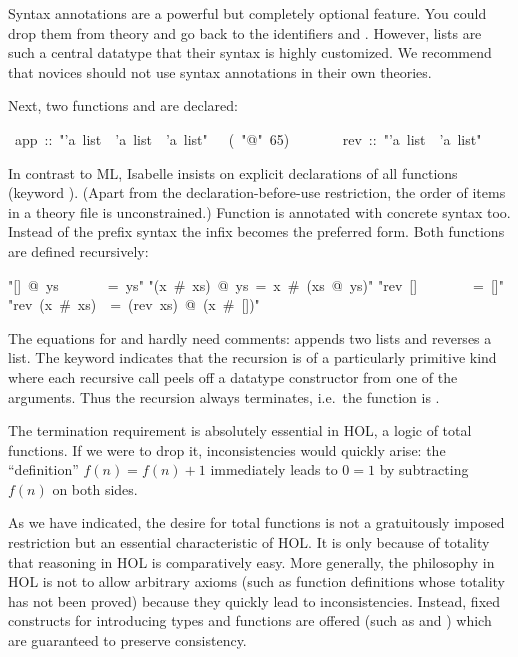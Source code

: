 \begin{isabelle}
\begin{isamarkuptext}
\begin{warn}
  Syntax annotations are a powerful but completely optional feature. You
  could drop them from theory  and go back to the identifiers
   and . However, lists are such a central datatype
  that their syntax is highly customized. We recommend that novices should
  not use syntax annotations in their own theories.
\end{warn}
Next, two functions  and  are declared:%
\end{isamarkuptext}%
\ app\ ::\ {"}'a\ list\ {\isasymRightarrow}\ 'a\ list\ {\isasymRightarrow}\ 'a\ list{"}\ \ \ (\ {"}@{"}\ 65)\isanewline
\ \ \ \ \ \ \ rev\ ::\ {"}'a\ list\ {\isasymRightarrow}\ 'a\ list{"}%
\begin{isamarkuptext}%
\noindent
In contrast to ML, Isabelle insists on explicit declarations of all functions
(keyword ).  (Apart from the declaration-before-use
restriction, the order of items in a theory file is unconstrained.) Function
 is annotated with concrete syntax too. Instead of the prefix
syntax  the infix
 becomes the preferred
form. Both functions are defined recursively:%
\end{isamarkuptext}%
\isanewline
{"}[]\ @\ ys\ \ \ \ \ \ \ =\ ys{"}\isanewline
{"}(x\ \#\ xs)\ @\ ys\ =\ x\ \#\ (xs\ @\ ys){"}\isanewline
\isanewline
{}\isanewline
{"}rev\ []\ \ \ \ \ \ \ \ =\ []{"}\isanewline
{"}rev\ (x\ \#\ xs)\ \ =\ (rev\ xs)\ @\ (x\ \#\ []){"}%
\begin{isamarkuptext}%
\noindent
The equations for  and  hardly need comments:
 appends two lists and  reverses a list.  The keyword
 indicates that the recursion is of a
particularly primitive kind where each recursive call peels off a datatype
constructor from one of the arguments.  Thus the
recursion always terminates, i.e.\ the function is .

The termination requirement is absolutely essential in HOL, a logic of total
functions. If we were to drop it, inconsistencies would quickly arise: the
``definition'' $f(n) = f(n)+1$ immediately leads to $0 = 1$ by subtracting
$f(n)$ on both sides.

\begin{warn}
  As we have indicated, the desire for total functions is not a gratuitously
  imposed restriction but an essential characteristic of HOL. It is only
  because of totality that reasoning in HOL is comparatively easy.  More
  generally, the philosophy in HOL is not to allow arbitrary axioms (such as
  function definitions whose totality has not been proved) because they
  quickly lead to inconsistencies. Instead, fixed constructs for introducing
  types and functions are offered (such as  and
  ) which are guaranteed to preserve consistency.
\end{warn}


\end{isamarkuptext}
\end{isabelle}
